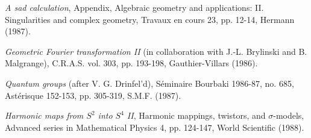 \begin{description}
\item[{[46]}] \emph{A sad calculation}, Appendix, Algebraic geometry and
applications: II. Singularities and complex geometry, Travaux en cours 23,
pp. 12-14, Hermann (1987).

\item[{[47]}] \emph{Geometric Fourier transformation II}
(in collaboration with J.-L. Brylinski and B. Malgrange), C.R.A.S. vol. 303,
pp. 193-198, Gauthier-Villars (1986).

\item[{[48]}] \emph{Quantum groups} (after V. G. Drinfel'd), Séminaire
Bourbaki 1986-87, no. 685, Astérisque 152-153, pp. 305-319, S.M.F. (1987).

\item[{[49]}] \emph{Harmonic maps from $S^2$ into $S^4$ II}, Harmonic
mappings, twistors, and $\sigma$-models, Advanced series in Mathematical
Physics 4, pp. 124-147, World Scientific (1988).
\end{description}

